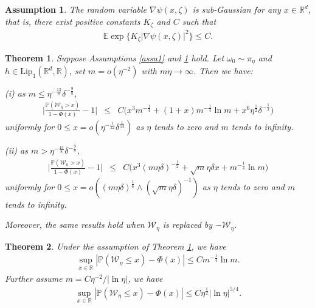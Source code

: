 \documentclass[10pt,a4paper]{amsart}
\newtheorem{assumption}{Assumption}
\newtheorem{theorem}{Theorem}
\newcommand{\E}{\mathbb{E}}            %
\newcommand{\PP}{\mathbb{P}}
\newcommand{\R}{\mathbb{R}}\newcommand{\RR}{\mathbb{R}}
\begin{document}
\begin{assumption}\label{assu2}
	The random variable $\nabla\psi(x,\zeta)$ is sub-Gaussian for any $x\in\R^d$, that is, there exist positive constants $K_\zeta$ and $C$ such that 
	\begin{eqnarray*}
		\E\exp\{K_\zeta|\nabla\psi(x,\zeta)|^2\} \le C.
	\end{eqnarray*} 
\end{assumption}

\begin{theorem}\label{thm-self-normal}
Suppose Assumptions \ref{assu1} and \ref{assu2} hold. Let $\omega_0\sim\pi_\eta$ and $h \in \mathrm{Lip}_1(\R^d,\R)$, set $m=o(\eta^{-2})$ with $m\eta\to\infty$. Then we have:

(i) as $m\le\eta^{-\frac{13}8}\delta^{-\frac98}$,
\begin{eqnarray*}
	\Big| \frac{\PP(\mathcal W_\eta> x)}{1-\Phi(x)}
	-1 \Big| & \le & 
	C\big(x^3m^{-\frac14}+(1+x)m^{-\frac14}\ln m+x^6\eta^{\frac12}\delta^{-\frac12}\big)
\end{eqnarray*}
uniformly for $0\le x=o(\eta^{{-\frac{1}{12}}}\delta^{\frac{1}{12}})$ as $\eta$ tends to zero and $m$ tends to infinity.  

(ii) as $m>\eta^{-\frac{13}8}\delta^{-\frac98}$,
\begin{eqnarray*}
	\Big| \frac{\PP(\mathcal W_\eta> x)}{1-\Phi(x)}
	-1 \Big| & \le & 
	C\big(x^3(m\eta\delta)^{-\frac12}+\sqrt m\eta\delta x+ m^{-\frac14}\ln m\big)
\end{eqnarray*}
uniformly for $0\le x=o( (m\eta\delta)^{\frac16}\wedge (\sqrt m\eta\delta)^{-1})$ as $\eta$ tends to zero and $m$ tends to infinity. 

Moreover, the same results hold when $\mathcal{W}_\eta$ is replaced by $-\mathcal{W}_\eta$.
\end{theorem}	

\begin{theorem}\label{coro:berry}
Under the assumption of Theorem \ref{thm-self-normal}, we have
\begin{eqnarray*}
	\sup_{x\in\R}|\PP(\mathcal{W}_\eta\le x)-\Phi(x)|\le Cm^{-\frac14}\ln m.
\end{eqnarray*}	
Further assume $m=C\eta^{-2}/|\ln\eta|$, we have
\begin{eqnarray*}
	\sup_{x\in\R}|\PP(\mathcal{W}_\eta\le x)-\Phi(x)|\le C\eta^{\frac12}|\ln \eta|^{5/4}.
\end{eqnarray*}	
\end{theorem}
\end{document}
